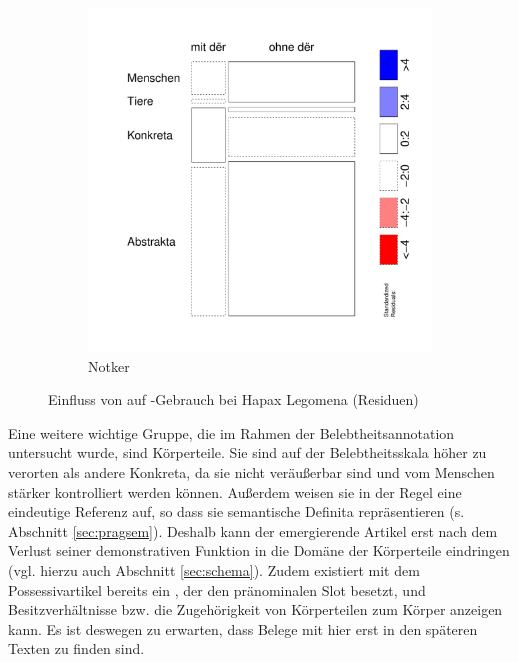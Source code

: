 \begin{figure}
\begin{subfigure}[b]{.5\linewidth}
  \includegraphics[height=.25\textheight]{generated/images/bel-hapaxe-residuals-N}
\caption {Notker}
\end{subfigure}
\caption{Einfluss von  auf -Gebrauch bei Hapax Legomena (Residuen)}
\label{fig:bel-hapaxe-residuals}
\end{figure}

Eine weitere wichtige Gruppe, die im Rahmen der Belebtheitsannotation   untersucht wurde, sind Körperteile. Sie sind auf der Belebtheitsskala  höher zu verorten als andere  Konkreta, da sie nicht veräußerbar sind und vom Menschen stärker kontrolliert werden können. Außerdem weisen sie in der Regel eine eindeutige Referenz  auf, so dass sie semantische Definita  repräsentieren (s.  Abschnitt \ref{sec:pragsem}). Deshalb kann der emergierende Artikel erst nach dem Verlust seiner demonstrativen Funktion in die Domäne der Körperteile eindringen (vgl. hierzu auch Abschnitt \ref{sec:schema}). Zudem existiert mit dem Possessivartikel  bereits ein , der den pränominalen Slot besetzt, und Besitzverhältnisse bzw. die Zugehörigkeit von Körperteilen zum Körper anzeigen kann. Es ist deswegen zu erwarten, dass Belege mit  hier erst in den späteren Texten zu finden sind. 

